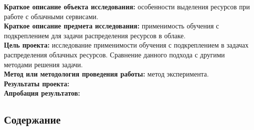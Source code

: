 \documentclass{article}
\begin{document}
\textbf{Краткое описание объекта исследования:} особенности выделения ресурсов при работе с облачными сервисами.\\
\textbf{Краткое описание предмета исследования:} применимость обучения с подкреплением для задачи распределения ресурсов в облаке.\\
\textbf{Цель проекта:} исследование применимости обучения с подкреплением в задачах распределения облачных ресурсов. Сравнение данного подхода с другими методами решения задачи. \\
\textbf{Метод или методология проведения работы:} метод эксперимента.\\
\textbf{Результаты проекта:}\\
\textbf{Апробация результатов:}\\
\newpage
\begin{center}
\section {Содержание}
\tableofcontents
\end{center}
\newpage
\end{document}
